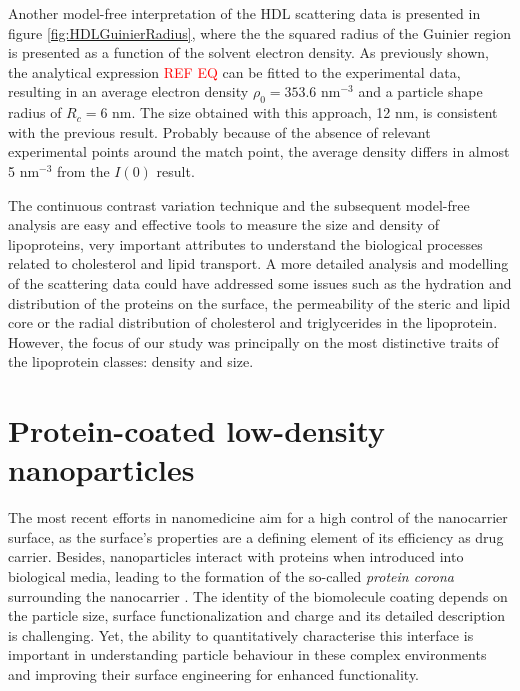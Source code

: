 Another model-free interpretation of the HDL scattering data is presented in figure \ref{fig:HDLGuinierRadius}, where the the squared radius of the Guinier region is presented as a function of the solvent electron density. As previously shown, the analytical expression \textcolor{red}{REF EQ} can be fitted to the experimental data, resulting in an average electron density $\rho_0=353.6$ nm$^{-3}$ and a particle shape radius of $R_c=6$ nm. The size obtained with this approach, 12 nm, is consistent with the previous result. Probably because of the absence of relevant experimental points around the match point, the average density differs in almost 5 nm$^{-3}$ from the $I(0)$ result.

The continuous contrast variation technique and the subsequent model-free analysis are easy and effective tools to measure the size and density of lipoproteins, very important attributes to understand the biological processes related to cholesterol and lipid transport. A more detailed analysis and modelling of the scattering data could have addressed some issues such as the hydration and distribution of the proteins on the surface, the permeability of the steric and lipid core or the radial distribution of cholesterol and triglycerides in the lipoprotein. However, the focus of our study was principally on the most distinctive traits of the lipoprotein classes: density and size.


\section{Protein-coated low-density nanoparticles}
\label{sec:CoatedKiskerExperimental}
The most recent efforts in nanomedicine aim for a high control of the nanocarrier surface, as the surface's properties are a defining element of its efficiency as drug carrier. Besides, nanoparticles interact with proteins when introduced into biological media, leading to the formation of the so-called \emph{protein corona} surrounding the nanocarrier \cite{cedervall_understanding_2007,monopoli_physicalchemical_2011,casals_time_2010}. The identity of the biomolecule coating depends on the particle size, surface functionalization and charge \cite{lundqvist_nanoparticle_2008,tenzer_rapid_2013,gessner_functional_2003} and its detailed description is challenging. Yet, the ability to quantitatively characterise this interface is important in understanding particle behaviour in these complex environments and improving their surface engineering for enhanced functionality.

